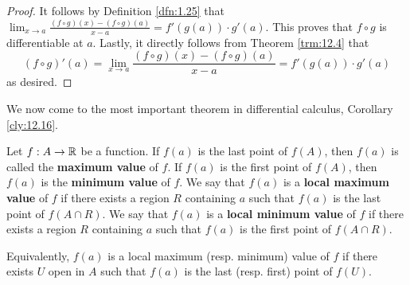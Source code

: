 \documentclass[../main.tex]{subfiles}
\begin{document}
\begin{theorem}
\begin{proof}
        It follows by Definition \ref{dfn:1.25} that $\lim_{x\to a}\frac{(f\circ g)(x)-(f\circ g)(a)}{x-a}=f'(g(a))\cdot g'(a)$. This proves that $f\circ g$ is differentiable at $a$. Lastly, it directly follows from Theorem \ref{trm:12.4} that
        \begin{equation*}
            (f\circ g)'(a) = \lim_{x\to a}\frac{(f\circ g)(x)-(f\circ g)(a)}{x-a}
            = f'(g(a))\cdot g'(a)
        \end{equation*}
        as desired.
    \end{proof}
\end{theorem}

We now come to the most important theorem in differential calculus, Corollary \ref{cly:12.16}.

\begin{definition}\label{dfn:12.11}
    Let $f:A\to\mathbb{R}$ be a function. If $f(a)$ is the last point of $f(A)$, then $f(a)$ is called the \textbf{maximum value} of $f$. If $f(a)$ is the first point of $f(A)$, then $f(a)$ is the \textbf{minimum value} of $f$. We say that $f(a)$ is a \textbf{local maximum value} of $f$ if there exists a region $R$ containing $a$ such that $f(a)$ is the last point of $f(A\cap R)$. We say that $f(a)$ is a \textbf{local minimum value} of $f$ if there exists a region $R$ containing $a$ such that $f(a)$ is the first point of $f(A\cap R)$.
\end{definition}

\begin{remark}\label{rmk:12.12}
    Equivalently, $f(a)$ is a local maximum (resp. minimum) value of $f$ if there exists $U$ open in $A$ such that $f(a)$ is the last (resp. first) point of $f(U)$.
\end{remark}
\end{document}
